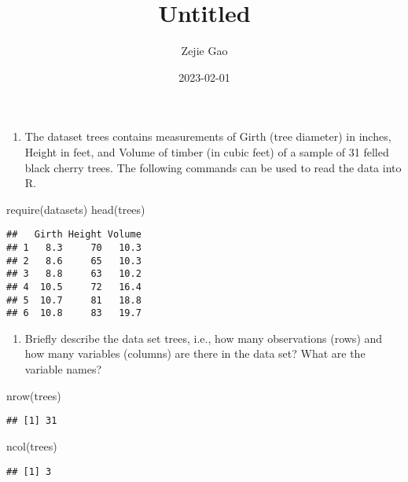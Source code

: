 \documentclass[
]{article}
\title{Untitled}
\author{Zejie Gao}
\date{2023-02-01}
\newenvironment{Shaded}{\begin{snugshade}}{\end{snugshade}}
\newcommand{\FunctionTok}[1]{\textcolor[rgb]{0.00,0.00,0.00}{#1}}
\newcommand{\NormalTok}[1]{#1}
\providecommand{\tightlist}{%
  \setlength{\itemsep}{0pt}\setlength{\parskip}{0pt}}
\begin{document}
\maketitle

\begin{enumerate}
\def\labelenumi{\arabic{enumi}.}
\tightlist
\item
  The dataset trees contains measurements of Girth (tree diameter) in
  inches, Height in feet, and Volume of timber (in cubic feet) of a
  sample of 31 felled black cherry trees. The following commands can be
  used to read the data into R.
\end{enumerate}

\begin{Shaded}
\begin{Highlighting}[]
\FunctionTok{require}\NormalTok{(datasets)}
\FunctionTok{head}\NormalTok{(trees)}
\end{Highlighting}
\end{Shaded}

\begin{verbatim}
##   Girth Height Volume
## 1   8.3     70   10.3
## 2   8.6     65   10.3
## 3   8.8     63   10.2
## 4  10.5     72   16.4
## 5  10.7     81   18.8
## 6  10.8     83   19.7
\end{verbatim}

\begin{enumerate}
\def\labelenumi{(\alph{enumi})}
\tightlist
\item
  Briefly describe the data set trees, i.e., how many observations
  (rows) and how many variables (columns) are there in the data set?
  What are the variable names?
\end{enumerate}

\begin{Shaded}
\begin{Highlighting}[]
\FunctionTok{nrow}\NormalTok{(trees)}
\end{Highlighting}
\end{Shaded}

\begin{verbatim}
## [1] 31
\end{verbatim}

\begin{Shaded}
\begin{Highlighting}[]
\FunctionTok{ncol}\NormalTok{(trees)}
\end{Highlighting}
\end{Shaded}

\begin{verbatim}
## [1] 3
\end{verbatim}
\end{document}
